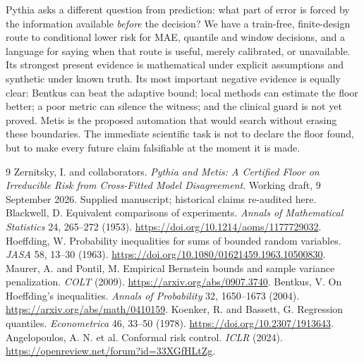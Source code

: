 \documentclass[11pt,a4paper]{article}
\begin{document}
Pythia asks a different question from prediction: what part of error is forced by the information available \emph{before} the decision? We have a train-free, finite-design route to conditional lower risk for MAE, quantile and window decisions, and a language for saying when that route is useful, merely calibrated, or unavailable. Its strongest present evidence is mathematical under explicit assumptions and synthetic under known truth. Its most important negative evidence is equally clear: Bentkus can beat the adaptive bound; local methods can estimate the floor better; a poor metric can silence the witness; and the clinical guard is not yet proved. Metis is the proposed automation that would search without erasing these boundaries. The immediate scientific task is not to declare the floor found, but to make every future claim falsifiable at the moment it is made.

\begingroup\small
\begin{thebibliography}{9}
 Zernitsky, I. and collaborators. \emph{Pythia and Metis: A Certified Floor on Irreducible Risk from Cross-Fitted Model Disagreement}. Working draft, 9 September 2026. Supplied manuscript; historical claims re-audited here.
 Blackwell, D. Equivalent comparisons of experiments. \emph{Annals of Mathematical Statistics} 24, 265--272 (1953). \url{https://doi.org/10.1214/aoms/1177729032}.
 Hoeffding, W. Probability inequalities for sums of bounded random variables. \emph{JASA} 58, 13--30 (1963). \url{https://doi.org/10.1080/01621459.1963.10500830}.
 Maurer, A. and Pontil, M. Empirical Bernstein bounds and sample variance penalization. \emph{COLT} (2009). \url{https://arxiv.org/abs/0907.3740}.
 Bentkus, V. On Hoeffding's inequalities. \emph{Annals of Probability} 32, 1650--1673 (2004). \url{https://arxiv.org/abs/math/0410159}.
 Koenker, R. and Bassett, G. Regression quantiles. \emph{Econometrica} 46, 33--50 (1978). \url{https://doi.org/10.2307/1913643}.
 Angelopoulos, A. N. et al. Conformal risk control. \emph{ICLR} (2024). \url{https://openreview.net/forum?id=33XGfHLtZg}.
\end{thebibliography}
\endgroup
\end{document}
